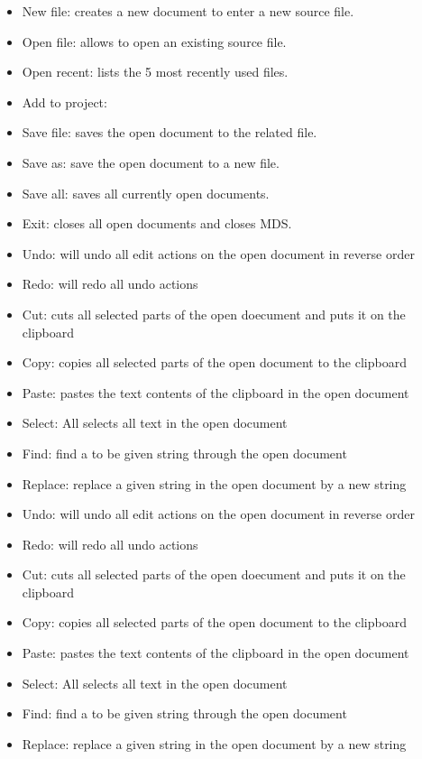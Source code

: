     \begin{itemize}
        \item New file: creates a new document to enter a new source file.
        \item Open file: allows to open an existing source file.
        \item Open recent: lists the 5 most recently used files.
        \item Add to project:
        \item Save file: saves the open document to the related file.
        \item Save as: save the open document to a new file.
        \item Save all: saves all currently open documents.
        \item Exit: closes all open documents and closes MDS.
    \end{itemize}

    \begin{itemize}
        \item Undo: will undo all edit actions on the open document in reverse order
        \item Redo: will redo all undo actions
        \item Cut: cuts all selected parts of the open doecument and puts it on the clipboard
        \item Copy: copies all selected parts of the open document to the clipboard
        \item Paste: pastes the text contents of the clipboard in the open document
        \item Select: All selects all text in the open document
        \item Find: find a to be given string through the open document
        \item Replace: replace a given string in the open document by a new string
    \end{itemize}

    \begin{itemize}
        \item Undo: will undo all edit actions on the open document in reverse order
        \item Redo: will redo all undo actions
        \item Cut: cuts all selected parts of the open doecument and puts it on the clipboard
        \item Copy: copies all selected parts of the open document to the clipboard
        \item Paste: pastes the text contents of the clipboard in the open document
        \item Select: All selects all text in the open document
        \item Find: find a to be given string through the open document
        \item Replace: replace a given string in the open document by a new string
    \end{itemize}

